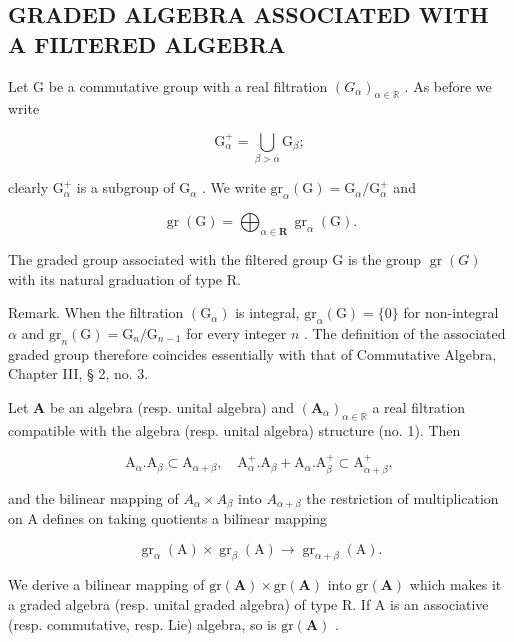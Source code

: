 \subsection{GRADED ALGEBRA ASSOCIATED WITH A FILTERED ALGEBRA}

Let G be a commutative group with a real filtration \((G_{\alpha})_{\alpha \in \mathbb{R}}\) . As before we write

\[
\mathrm{G} _ {\alpha} ^ {+} = \bigcup_ {\beta > \alpha} \mathrm{G} _ {\beta};\tag{9}
\]

clearly \(\mathrm{G}_{\alpha}^{+}\) is a subgroup of \(\mathrm{G}_{\alpha}\) . We write \(\mathrm{gr}_{\alpha}(\mathrm{G}) = \mathrm{G}_{\alpha} / \mathrm{G}_{\alpha}^{+}\) and

\[
\operatorname{gr} (\mathrm{G}) = \bigoplus_ {\alpha \in \mathbf {R}} \operatorname{gr} _ {\alpha} (\mathrm{G}).
\]

The graded group associated with the filtered group G is the group \(\operatorname{gr}(G)\) with its natural graduation of type R.

Remark. When the filtration \((\mathrm{G}_{\alpha})\) is integral, \(\mathrm{gr}_{\alpha}(\mathrm{G}) = \{0\}\) for non-integral \(\alpha\) and \(\mathrm{gr}_n(\mathrm{G}) = \mathrm{G}_n / \mathrm{G}_{n - 1}\) for every integer \(n\) . The definition of the associated graded group therefore coincides essentially with that of Commutative Algebra, Chapter III, § 2, no. 3.

Let \(\mathbf{A}\) be an algebra (resp. unital algebra) and \((\mathbf{A}_{\alpha})_{\alpha \in \mathbb{R}}\) a real filtration compatible with the algebra (resp. unital algebra) structure (no. 1). Then

\[
\mathrm{A} _ {\alpha}. \mathrm{A} _ {\beta} \subset \mathrm{A} _ {\alpha + \beta}, \quad \mathrm{A} _ {\alpha} ^ {+}. \mathrm{A} _ {\beta} + \mathrm{A} _ {\alpha}. \mathrm{A} _ {\beta} ^ {+} \subset \mathrm{A} _ {\alpha + \beta} ^ {+},
\]

and the bilinear mapping of \(A_{\alpha} \times A_{\beta}\) into \(A_{\alpha+\beta}\) the restriction of multiplication on A defines on taking quotients a bilinear mapping

\[
\operatorname{gr} _ {\alpha} (\mathrm{A}) \times \operatorname{gr} _ {\beta} (\mathrm{A}) \rightarrow \operatorname{gr} _ {\alpha + \beta} (\mathrm{A}).
\]

We derive a bilinear mapping of \(\mathrm{gr}(\mathbf{A}) \times \mathrm{gr}(\mathbf{A})\) into \(\mathrm{gr}(\mathbf{A})\) which makes it a graded algebra (resp. unital graded algebra) of type R. If A is an associative (resp. commutative, resp. Lie) algebra, so is \(\mathrm{gr}(\mathbf{A})\) .

